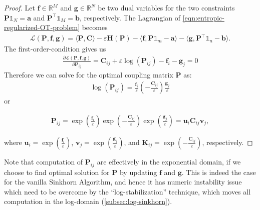 \begin{proof}
  Let $\mathbf{f} \in \mathbb{R}^M$ and $\mathbf{g} \in \mathbb{R}^N$ be two dual variables for the two constraints
  $\mathbf{P} \mathbb{1}_N = \mathbf{a}$ and $\mathbf{P}^\top \mathbb{1}_M = \mathbf{b}$, respectively.
  The Lagrangian of \cref{eqn:entropic-regularized-OT-problem} becomes
  \begin{equation}\label{eqn:regularized-OT-lagrangian}
    \begin{aligned}
      \mathscr{L}(\mathbf{P}, \mathbf{f}, \mathbf{g}) =
      \langle \mathbf{P}, \mathbf{C}\rangle - \varepsilon \mathbf{H}(\mathbf{P}) -
      \langle \mathbf{f}, \mathbf{P} \mathbb{1}_m - \mathbf{a}\rangle  -
      \langle \mathbf{g}, \mathbf{P}^\top \mathbb{1}_n - \mathbf{b}\rangle.
    \end{aligned}
  \end{equation}
  The first-order-condition gives us
  \begin{equation*}
    \begin{aligned}
      \frac{
        \partial \mathscr{L}(\mathbf{P}, \mathbf{f}, \mathbf{g})
      }{
        \partial \mathbf{P}_{ij}
      } = \mathbf{C}_{ij} + \varepsilon \log(\mathbf{P}_{ij}) - \mathbf{f}_i - \mathbf{g}_j = 0
    \end{aligned}
  \end{equation*}
  Therefore we can solve for the optimal coupling matrix $\mathbf{P}$ as:
  \begin{equation*}
    \begin{aligned}
      \log(\mathbf{P}_{ij})
      =
      \frac{\mathbf{f}_i}{\varepsilon}
      \left(-\frac{\mathbf{C}_{ij}}{\varepsilon}\right)
      \frac{\mathbf{g}_j}{\varepsilon}
    \end{aligned}
  \end{equation*}
  or

  \begin{equation}\label{eqn:optimal-coupling}
    \begin{aligned}
      \mathbf{P}_{ij}
      =
      \exp(\frac{\mathbf{f}_i}{\varepsilon})
      \exp(-\frac{\mathbf{C}_{ij}}{\varepsilon})
      \exp(\frac{\mathbf{g}_j}{\varepsilon})
      =
      \mathbf{u}_i \mathbf{C}_{ij} \mathbf{v}_j,
    \end{aligned}
  \end{equation}

  where $\mathbf{u}_i = \exp(\frac{\mathbf{f}_i}{\varepsilon})$,
  $\mathbf{v}_j = \exp(\frac{\mathbf{g}_j}{\varepsilon})$, and
  $\mathbf{K}_{ij} = \exp(-\frac{\mathbf{C}_{ij}}{\varepsilon})$, respectively.
\end{proof}

\begin{remark}[]
  Note that computation of $\mathbf{P}_{ij}$ are effectively in the exponential domain, if we choose to find
  optimal solution for $\mathbf{P}$ by updating $\mathbf{f}$ and $\mathbf{g}$.
  This is indeed the case for the vanilla Sinkhorn Algorithm, and hence it has numeric instability issue
  which need to be overcome by the ``log-stabilization'' technique,
  which moves all computation in the log-domain (\cref{subsec:log-sinkhorn}).
\end{remark}
